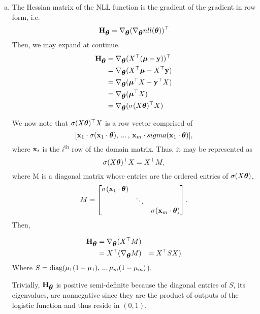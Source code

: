 \documentclass[12pt,letterpaper]{hmcpset}
\begin{document}
\begin{solution}
\begin{enumerate}[(a)]
		\item 
		The Hessian matrix of the NLL function is the gradient of the gradient in row form, i.e.
		\[
			{\bf H}_{\hbox{\boldmath$\theta$}} = \nabla_{\hbox{\boldmath$\theta$}}( \nabla_{\hbox{\boldmath$\theta$}} nll(\hbox{\boldmath$\theta$}))^\top
		\]
		Then, we may expand at continue.
		\begin{align*}
			{\bf H}_{\hbox{\boldmath$\theta$}} &=  \nabla_{\hbox{\boldmath$\theta$}}( X^\top (\hbox{\boldmath$\mu$} - {\bf y}) )^\top \\
			&= \nabla_{\hbox{\boldmath$\theta$}}( X^\top \hbox{\boldmath$\mu$} - X^\top {\bf y}) \\
			&= \nabla_{\hbox{\boldmath$\theta$}}( \hbox{\boldmath$\mu$}^\top X - {\bf y}^\top X) \\
			&= \nabla_{\hbox{\boldmath$\theta$}}( \hbox{\boldmath$\mu$}^\top X ) \\
			&= \nabla_{\hbox{\boldmath$\theta$}}( \sigma( X \hbox{\boldmath$\theta$})^\top X)
		\end{align*}

		We now note that $\sigma( X \hbox{\boldmath$\theta$})^\top X$ is a row vector comprised of 
		\[
			[{\bf x}_1 \cdot \sigma({\bf x}_1 \cdot \hbox{\boldmath$\theta$}), \, ... \, , \,  {\bf x}_m \cdot \\sigma({\bf x}_1 \cdot \hbox{\boldmath$\theta$})],
		\]
		where ${\bf x}_i$ is the $i^{\text{th}}$ row of the domain matrix. Thus, it may be represented as 
		\[
			\sigma( X \hbox{\boldmath$\theta$})^\top X = X^\top M,
		\]
		where M is a diagonal matrix whose entries are the ordered entries of $\sigma(X \hbox{\boldmath$\theta$})$,
		\[
			M = 
			\begin{bmatrix} 
				\sigma({\bf x}_1 \cdot \hbox{\boldmath$\theta$}) & &  \\
				 & \ddots & \\
				 &  & \sigma({\bf x}_m \cdot \hbox{\boldmath$\theta$})
			\end{bmatrix}.
		\]
		Then,
		 
		\begin{align*}
			{\bf H}_{\hbox{\boldmath$\theta$}} &= \nabla_{\hbox{\boldmath$\theta$}}( X^\top M )\\
			&= X^\top (\nabla_{\hbox{\boldmath$\theta$}}M)
			&= X^\top S X)
		\end{align*}
		Where $S = {\hbox{diag}}(\mu_1(1 - \mu_1), \, ... \, \mu_m(1 - \mu_m)$).

		Trivially, ${\bf H}_{\hbox{\boldmath$\theta$}}$ is positive semi-definite because the diagonal entries of $S$, its eigenvalues, are nonnegative since they are the product of outputs of the logistic function and thus reside in $(0, 1)$.
		



	\end{enumerate}
	\vfill
\end{solution}
\newpage
\end{document}
